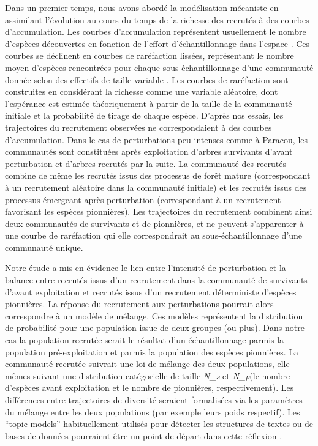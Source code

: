 \documentclass[
  11pt,
  french,
  A4paper,
  extrafontsizes,onecolumn,openright
  ]{memoir}
\begin{document}
Dans un premier temps, nous avons abordé la modélisation mécaniste en
assimilant l'évolution au cours du temps de la richesse des recrutés à
des courbes d'accumulation. Les courbes d'accumulation représentent
usuellement le nombre d'espèces découvertes en fonction de l'effort
d'échantillonnage dans l'espace \autocite{Gotelli2001}. Ces courbes se
déclinent en courbes de raréfaction lissées, représentant le nombre
moyen d'espèces rencontrées pour chaque sous-échantillonnage d'une
communauté donnée selon des effectifs de taille variable
\autocite{Ugland2003}. Les courbes de raréfaction sont construites en
considérant la richesse comme une variable aléatoire, dont l'espérance
est estimée théoriquement à partir de la taille de la communauté
initiale et la probabilité de tirage de chaque espèce. D'après nos
essais, les trajectoires du recrutement observées ne correspondaient à
des courbes d'accumulation. Dans le cas de perturbations peu intenses
comme à Paracou, les communautés sont constituées après exploitation
d'arbres survivants d'avant perturbation et d'arbres recrutés par la
suite. La communauté des recrutés combine de même les recrutés issus des
processus de forêt mature (correspondant à un recrutement aléatoire dans
la communauté initiale) et les recrutés issus des processus émergeant
après perturbation (correspondant à un recrutement favorisant les
espèces pionnières). Les trajectoires du recrutement combinent ainsi
deux communautés de survivants et de pionnières, et ne peuvent
s'apparenter à une courbe de raréfaction qui elle correspondrait au
sous-échantillonnage d'une communauté unique.

Notre étude a mis en évidence le lien entre l'intensité de perturbation
et la balance entre recrutés issus d'un recrutement dans la communauté
de survivants d'avant exploitation et recrutés issus d'un recrutement
déterministe d'espèces pionnières. La réponse du recrutement aux
perturbations pourrait alors correspondre à un modèle de mélange. Ces
modèles représentent la distribution de probabilité pour une population
issue de deux groupes (ou plus). Dans notre cas la population recrutée
serait le résultat d'un échantillonnage parmis la population
pré-exploitation et parmis la population des espèces pionnières. La
communauté recrutée suivrait une loi de mélange des deux populations,
elle-mêmes suivant une distribution catégorielle de taille \emph{N\_s}
et \emph{N\_p}(le nombre d'espèces avant exploitation et le nombre de
pionnières, respectivement). Les différences entre trajectoires de
diversité seraient formalisées via les paramètres du mélange entre les
deux populations (par exemple leurs poids respectif). Les ``topic
models'' habituellement utilisés pour détecter les structures de textes
ou de bases de données pourraient être un point de départ dans cette
réflexion \autocites{Mclachlan2000}{Blei2012}.
\end{document}
